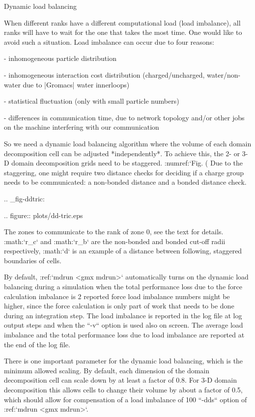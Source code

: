 Dynamic load balancing
~~~~~~~~~~~~~~~~~~~~~~

When different ranks have a different computational load (load
imbalance), all ranks will have to wait for the one that takes the most
time. One would like to avoid such a situation. Load imbalance can occur
due to four reasons:

-  inhomogeneous particle distribution

-  inhomogeneous interaction cost distribution (charged/uncharged,
   water/non-water due to |Gromacs| water innerloops)

-  statistical fluctuation (only with small particle numbers)

-  differences in communication time, due to network topology and/or
   other jobs on the machine interfering with our communication

So we need a dynamic load balancing algorithm where the volume of each
domain decomposition cell can be adjusted *independently*. To achieve
this, the 2- or 3-D domain decomposition grids need to be staggered.
:numref:`Fig. (%
Due to the staggering, one might require two distance checks for
deciding if a charge group needs to be communicated: a non-bonded
distance and a bonded distance check.

.. _fig-ddtric:

.. figure:: plots/dd-tric.eps

   The zones to communicate to the rank of zone 0, see the text
   for details. :math:`r_c` and :math:`r_b` are the non-bonded and
   bonded cut-off radii respectively, :math:`d` is an example of a
   distance between following, staggered boundaries of cells.

By default, :ref:`mdrun <gmx mdrun>` automatically turns on the dynamic
load balancing during a simulation when the total performance loss due
to the force calculation imbalance is 2%
reported force load imbalance numbers might be higher, since the force
calculation is only part of work that needs to be done during an
integration step. The load imbalance is reported in the log file at log
output steps and when the ``-v`` option is used also on
screen. The average load imbalance and the total performance loss due to
load imbalance are reported at the end of the log file.

There is one important parameter for the dynamic load balancing, which
is the minimum allowed scaling. By default, each dimension of the domain
decomposition cell can scale down by at least a factor of 0.8. For 3-D
domain decomposition this allows cells to change their volume by about a
factor of 0.5, which should allow for compensation of a load imbalance
of 100%
``-dds`` option of :ref:`mdrun <gmx mdrun>`.

